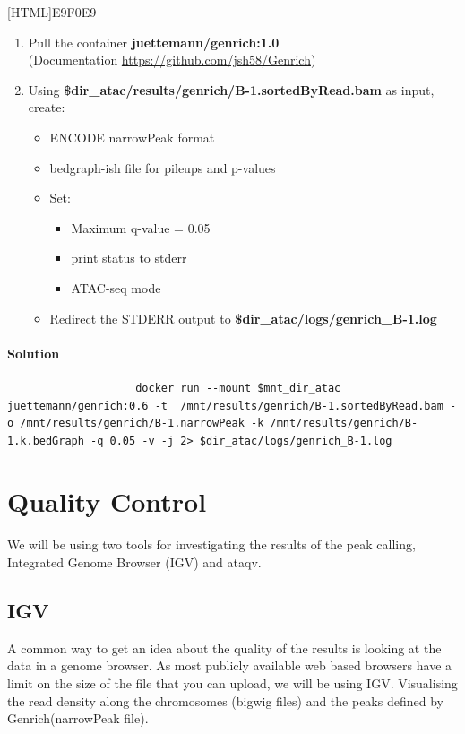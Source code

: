 \documentclass[12pt]{article}
\begin{document}
			[HTML]{E9F0E9}{\parbox{\linewidth}{%
					\begin{enumerate}
						\item  Pull the container  \textbf{juettemann/genrich:1.0} \\
						(Documentation  \url{https://github.com/jsh58/Genrich})
						\item Using\textbf{ \$dir\_atac/results/genrich/B-1.sortedByRead.bam} as input, create:
						\begin{itemize}
							\item ENCODE narrowPeak format
							\item bedgraph-ish file for pileups and p-values
							\item Set:
							\begin{itemize}
								\item Maximum q-value = 0.05
								\item print status to stderr
								\item ATAC-seq mode 
							\end{itemize}
							\item Redirect the STDERR output to \textbf{\$dir\_atac/logs/genrich\_B-1.log}
						\end{itemize}
					\end{enumerate}
			}}
			
			
			\paragraph{Solution}
				
			\begin{minipage}{\linewidth}
				\begin{lstlisting}
					docker run --mount $mnt_dir_atac juettemann/genrich:0.6 -t  /mnt/results/genrich/B-1.sortedByRead.bam -o /mnt/results/genrich/B-1.narrowPeak -k /mnt/results/genrich/B-1.k.bedGraph -q 0.05 -v -j 2> $dir_atac/logs/genrich_B-1.log
				\end{lstlisting}
			\end{minipage}
	
	\section{Quality Control}
		We will be using two tools for investigating the results of the peak calling, Integrated Genome Browser (IGV) and ataqv.
		
		\subsection{IGV}
			A common way to get an idea about the quality of the results is looking at the data in a genome browser. 
			As most publicly available web based browsers have a limit on the size of the file that you can upload, we will be using IGV.
			Visualising the read density along the chromosomes (bigwig files) and the peaks defined by Genrich(narrowPeak file).
		
\end{document}
